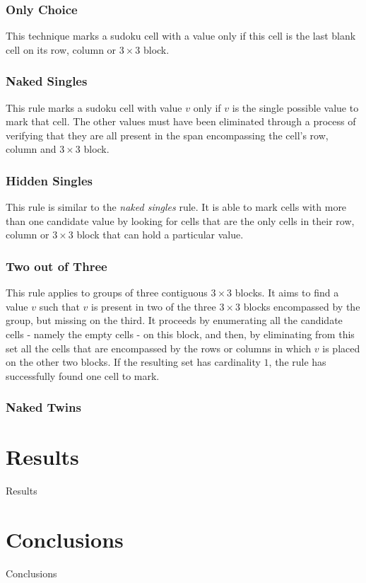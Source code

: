 \documentclass{article}
\begin{document}
\subsubsection{Only Choice}

This technique marks a sudoku cell with a value only if this cell is the last blank cell on its row, column or $3 \times 3$ block.

\subsubsection{Naked Singles}

This rule marks a sudoku cell with value $v$ only if $v$ is the single possible value to mark that cell. The other values must have been eliminated through a process of verifying that they are all present in the span encompassing the cell's row, column and $3 \times 3$ block.

\subsubsection{Hidden Singles}

This rule is similar to the {\em naked singles} rule. It is able to mark cells with more than one candidate value by looking for cells that are the only cells in their row, column or $3 \times 3$ block that can hold a particular value.

\subsubsection{Two out of Three}

This rule applies to groups of three contiguous $3 \times 3$ blocks. It aims to find a value $v$ such that $v$ is present in two of the three $3 \times 3$ blocks encompassed by the group, but missing on the third. It proceeds by enumerating all the candidate cells - namely the empty cells - on this block, and then, by eliminating from this set all the cells that are encompassed by the rows or columns in which $v$ is placed on the other two blocks. If the resulting set has cardinality $1$, the rule has successfully found one cell to mark.

\subsubsection{Naked Twins}

\section{Results}

Results

\section{Conclusions}

Conclusions



\end{document}
